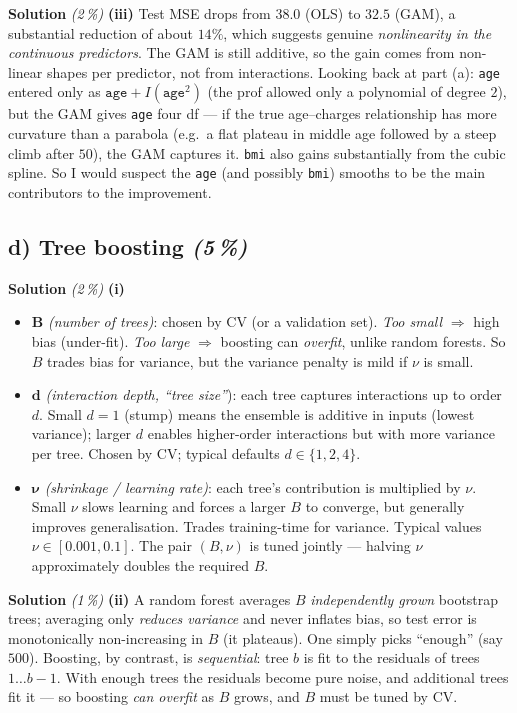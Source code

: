 \documentclass[11pt,a4paper]{article}
\newcommand{\subpoints}[1]{\textit{(#1\,\%)}}
\newcommand{\sol}{\noindent\textbf{Solution}}
\begin{document}
\medskip
\sol{} \subpoints{2} \textbf{(iii)} Test MSE drops from $38.0$ (OLS) to $32.5$ (GAM), a
substantial reduction of about $14\%$, which suggests genuine \emph{nonlinearity in the
continuous predictors}. The GAM is still additive, so the gain comes from non-linear shapes per
predictor, not from interactions. Looking back at part (a): \texttt{age} entered only as
$\texttt{age}+I(\texttt{age}^2)$ (the prof allowed only a polynomial of degree $2$), but the
GAM gives \texttt{age} four df --- if the true age--charges relationship has more curvature than
a parabola (e.g.\ a flat plateau in middle age followed by a steep climb after $50$), the GAM
captures it. \texttt{bmi} also gains substantially from the cubic spline. So I would suspect the
\texttt{age} (and possibly \texttt{bmi}) smooths to be the main contributors to the improvement.

\subsection*{d) Tree boosting \subpoints{5}}

\sol{} \subpoints{2} \textbf{(i)}
\begin{itemize}
  \item $\bm B$ \emph{(number of trees)}: chosen by CV (or a validation set). \emph{Too small}
        $\Rightarrow$ high bias (under-fit). \emph{Too large} $\Rightarrow$ boosting can
        \emph{overfit}, unlike random forests. So $B$ trades bias for variance, but the variance
        penalty is mild if $\nu$ is small.
  \item $\bm d$ \emph{(interaction depth, ``tree size''}): each tree captures interactions up to
        order $d$. Small $d=1$ (stump) means the ensemble is additive in inputs (lowest variance);
        larger $d$ enables higher-order interactions but with more variance per tree. Chosen by
        CV; typical defaults $d\in\{1,2,4\}$.
  \item $\bm\nu$ \emph{(shrinkage / learning rate)}: each tree's contribution is multiplied by
        $\nu$. Small $\nu$ slows learning and forces a larger $B$ to converge, but generally
        improves generalisation. Trades training-time for variance. Typical values
        $\nu\in[0.001,0.1]$. The pair $(B,\nu)$ is tuned jointly --- halving $\nu$ approximately
        doubles the required $B$.
\end{itemize}

\medskip
\sol{} \subpoints{1} \textbf{(ii)} A random forest averages $B$ \emph{independently grown}
bootstrap trees; averaging only \emph{reduces variance} and never inflates bias, so test error is
monotonically non-increasing in $B$ (it plateaus). One simply picks ``enough'' (say $500$).
Boosting, by contrast, is \emph{sequential}: tree $b$ is fit to the residuals of trees $1\ldots b-1$.
With enough trees the residuals become pure noise, and additional trees fit it --- so boosting
\emph{can overfit} as $B$ grows, and $B$ must be tuned by CV.
\end{document}
